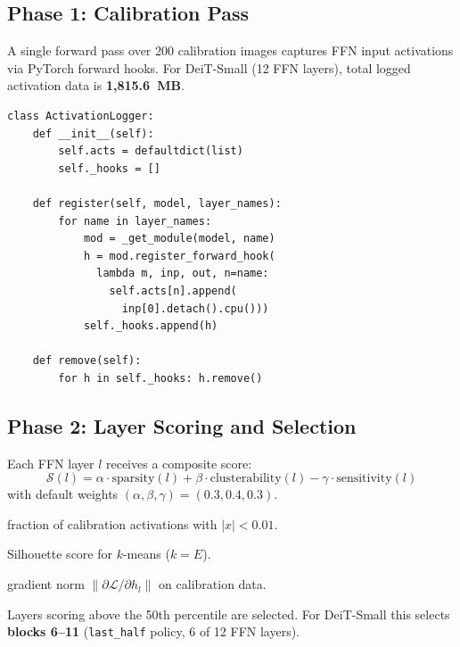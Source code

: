 \documentclass[conference]{IEEEtran}
\begin{document}
\subsection{Phase 1: Calibration Pass}

A single forward pass over 200 calibration images captures FFN input
activations via PyTorch forward hooks.
For DeiT-Small (12 FFN layers), total logged activation data is
\textbf{1,815.6~MB}.

\begin{lstlisting}[caption={Activation logging via forward hooks
(\texttt{clear\_moe/calibration.py}).},label={lst:hooks}]
class ActivationLogger:
    def __init__(self):
        self.acts = defaultdict(list)
        self._hooks = []

    def register(self, model, layer_names):
        for name in layer_names:
            mod = _get_module(model, name)
            h = mod.register_forward_hook(
              lambda m, inp, out, n=name:
                self.acts[n].append(
                  inp[0].detach().cpu()))
            self._hooks.append(h)

    def remove(self):
        for h in self._hooks: h.remove()
\end{lstlisting}

\subsection{Phase 2: Layer Scoring and Selection}

Each FFN layer $l$ receives a composite score:
\begin{equation}
\mathcal{S}(l) = \alpha \cdot \text{sparsity}(l)
               + \beta  \cdot \text{clusterability}(l)
               - \gamma \cdot \text{sensitivity}(l)
\label{eq:score}
\end{equation}
with default weights $(\alpha,\beta,\gamma)=(0.3,0.4,0.3)$.

\begin{description}[leftmargin=*,noitemsep]
\item[Sparsity:] fraction of calibration activations with $|x|<0.01$.
\item[Clusterability:] Silhouette score for $k$-means ($k=E$).
\item[Sensitivity:] gradient norm $\|\partial\mathcal{L}/\partial h_l\|$
  on calibration data.
\end{description}

Layers scoring above the 50th percentile are selected.
For DeiT-Small this selects \textbf{blocks 6--11}
(\texttt{last\_half} policy, 6 of 12 FFN layers).
\end{document}
